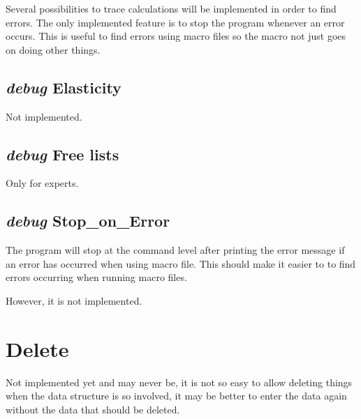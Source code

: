 \documentclass[12pt]{article}
\begin{document}
Several possibilities to trace calculations will be implemented in
order to find errors.  The only implemented feature is to stop the
program whenever an error occurs.  This is useful to find errors using
macro files so the macro not just goes on doing other things.

\subsection{{\em debug} Elasticity}

Not implemented.

\subsection{{\em debug} Free lists}

Only for experts.

\subsection{{\em debug} Stop\_on\_Error}

The program will stop at the command level after printing the error
message if an error has occurred when using macro file.  This should
make it easier to to find errors occurring when running macro files.

However, it is not implemented.

\section{Delete }

Not implemented yet and may never be, it is not so easy to allow
deleting things when the data structure is so involved, it may be
better to enter the data again without the data that should be
deleted.
\end{document}
